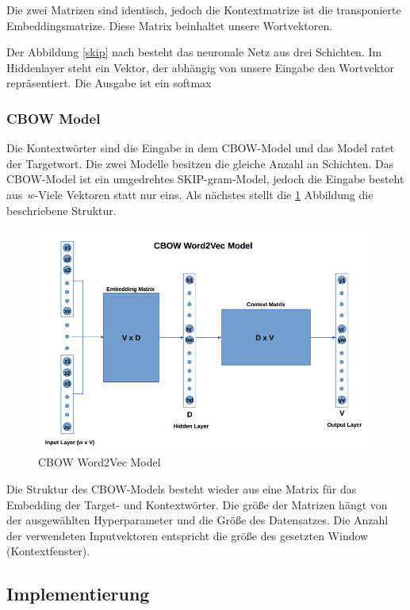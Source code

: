 Die zwei Matrizen sind identisch, jedoch die Kontextmatrize ist die transponierte Embeddingsmatrize. Diese Matrix beinhaltet unsere Wortvektoren.

Der Abbildung \ref{skip} nach besteht das neuronale Netz aus drei Schichten. Im Hiddenlayer steht ein Vektor, der abhängig von unsere Eingabe den Wortvektor repräsentiert. Die Ausgabe ist ein softmax

\subsubsection{CBOW Model}
Die Kontextwörter sind die Eingabe in dem CBOW-Model und das Model ratet der Targetwort. Die zwei Modelle besitzen die gleiche Anzahl an Schichten. Das CBOW-Model ist ein umgedrehtes SKIP-gram-Model, jedoch die Eingabe besteht aus $\emph{w}$-Viele Vektoren statt nur eins. Als nächstes stellt die \ref{cbow} Abbildung die beschriebene Struktur.

\begin{figure}
	\centering
	\includegraphics[scale=0.5]{images/CBOW_Model.png}
	\caption{CBOW Word2Vec Model}
	\label{cbow}
\end{figure}

Die Struktur des CBOW-Models besteht wieder aus eine Matrix für das Embedding der Target- und Kontextwörter. Die größe der Matrizen hängt von der ausgewählten Hyperparameter und die Größe des Datensatzes. Die Anzahl der verwendeten Inputvektoren entspricht die größe des gesetzten Window (Kontextfenster).

\subsection{Implementierung}